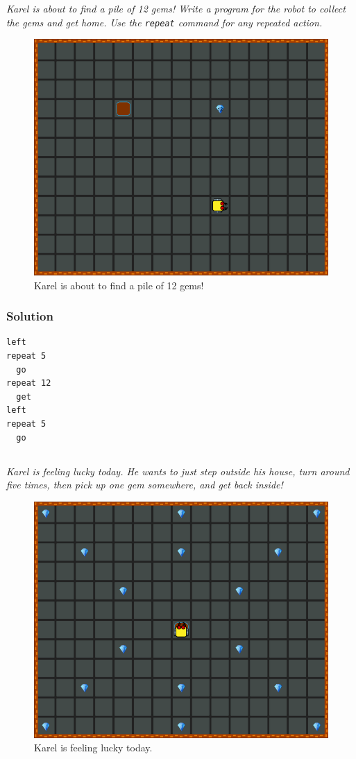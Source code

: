\documentclass[article,A4,12pt]{llncs}
\begin{document}
{{{{\em Karel is about to find a pile of 12 gems! Write a program for the robot to collect the gems and get home. Use the {\tt repeat} command for any repeated action. 

\begin{figure}[!ht]
\begin{center}
\includegraphics[height=0.4\textwidth]{imgk/c02.png}
\end{center}
\vspace{-4mm}
\caption{Karel is about to find a pile of 12 gems!}
\label{fig:c02}
\vspace{-10mm}
\end{figure}
\noindent

\subsubsection{Solution}
\begin{verbatim}
left
repeat 5
  go
repeat 12
  get
left
repeat 5
  go
\end{verbatim}

\newpage
\subsection{}

{\em Karel is feeling lucky today. He wants to just step outside his house, 
turn around five times, then pick up one gem somewhere, and get back inside!}


\begin{figure}[!ht]
\begin{center}
\includegraphics[height=0.4\textwidth]{imgk/c03.png}
\end{center}
\vspace{-4mm}
\caption{Karel is feeling lucky today.}
\label{fig:c03}
\vspace{-4mm}
\end{figure}
\noindent

}}}}
\end{document}
